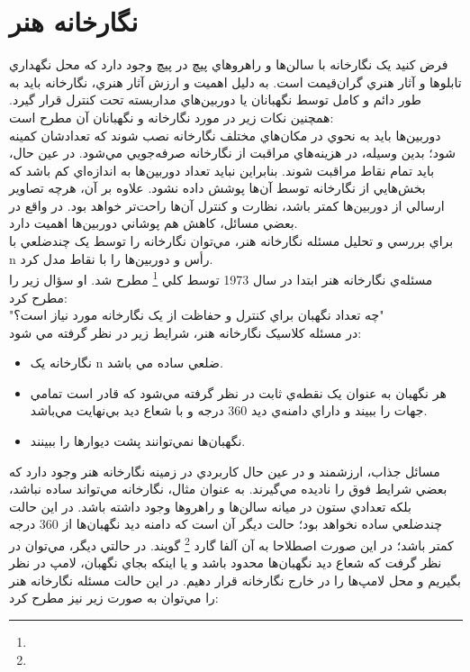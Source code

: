 \documentclass{book}
\begin{document}
                \section*{نگارخانه هنر}
                فرض کنيد يک نگارخانه با سالن‌ها و راهروهاي پيچ در پيچ وجود دارد که محل نگهداري تابلوها و آثار هنري گران‌قيمت است. به دليل اهميت و ارزش آثار هنري، نگارخانه بايد به طور دائم و کامل توسط نگهبانان يا دوربين‌هاي مداربسته تحت کنترل قرار گيرد. همچنين نکات زير در مورد نگارخانه و نگهبانان آن مطرح است:\\
                دوربين‌ها بايد به نحوي در مکان‌هاي مختلف نگارخانه نصب شوند که تعدادشان کمينه شود؛ بدين وسيله، در هزينه‌هاي مراقبت از نگارخانه صرفه‌جويي مي‌شود. در عين حال، بايد تمام نقاط مراقبت شوند. بنابراين نبايد تعداد دوربين‌ها به اندازه‌اي کم باشد که بخش‌هايي از نگارخانه توسط آن‌ها پوشش داده نشود. علاوه بر آن، هرچه تصاوير ارسالي از دوربين‌ها کمتر باشد، نظارت و کنترل آن‌ها راحت‌تر خواهد بود. در واقع در بعضي مسائل، کاهش هم پوشاني دوربين‌ها اهميت دارد.\\
                براي بررسي و تحليل مسئله نگارخانه هنر، مي‌توان نگارخانه را توسط يک چندضلعي با n رأس و دوربين‌ها را با نقاط مدل کرد. \\
                مسئله‌ي نگارخانه هنر ابتدا در سال 1973 توسط کلي  
                \footnote{}
                مطرح شد. او سؤال زير را مطرح کرد:\\
       "چه تعداد نگهبان براي کنترل و حفاظت از يک نگارخانه مورد نياز است؟"\\
       در مسئله کلاسيک نگارخانه هنر، شرايط زير در نظر گرفته مي شود: 
       \begin{itemize}
       	\item 
       		نگارخانه يک n ضلعي ساده مي باشد.  
\item 
       	هر نگهبان به عنوان يک نقطه‌ي ثابت در نظر گرفته مي‌شود که قادر است تمامي جهات را ببيند و داراي دامنه‌ي ديد 360 درجه و با شعاع ديد بي‌نهايت مي‌باشد.
       	\item 
       	نگهبان‌ها نمي‌توانند پشت ديوارها را ببينند.
       \end{itemize}
   مسائل جذاب، ارزشمند و در عين حال کاربردي در زمينه نگارخانه هنر وجود دارد که بعضي شرايط فوق را ناديده مي‌گيرند. به عنوان مثال، نگارخانه مي‌تواند ساده نباشد، بلکه تعدادي ستون در ميانه سالن‌ها و راهروها وجود داشته باشد. در اين حالت چندضلعي ساده نخواهد بود؛ حالت ديگر آن است که دامنه ديد نگهبان‌ها از 360 درجه کمتر باشد؛ در اين صورت اصطلاحا به آن آلفا گارد 
   \footnote{}
    گويند. در حالتي ديگر، مي‌توان در نظر گرفت که شعاع ديد نگهبان‌ها محدود باشد و يا اينکه بجاي نگهبان، لامپ در نظر بگيريم و محل لامپ‌ها را در خارج نگارخانه قرار دهيم. در اين حالت مسئله نگارخانه هنر را مي‌توان به صورت زير نيز مطرح کرد:\\
\end{document}
